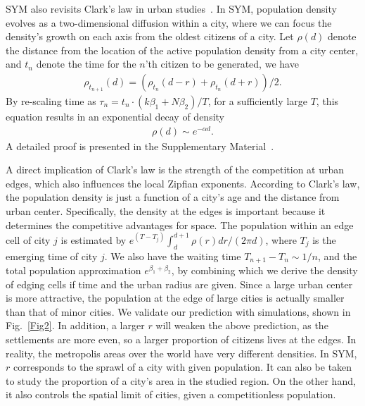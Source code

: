 SYM also revisits Clark's law in urban studies~\cite{clark1951urban}. In SYM, population density evolves as a two-dimensional diffusion within a city\cite{doi:10.1137/0150099}, where we can focus the density's growth on each axis from the oldest citizens of a city. Let $\rho(d)$ denote the distance from the location of the active population density from a city center, and $t_n$ denote the time for the $n$'th citizen to be generated, we have 
\begin{align}
	\rho_{t_{n+1}}(d) = (\rho_{t_{n}}(d-r) + \rho_{t_{n}}(d+r) )/2.\label{loc_den}  
\end{align} By re-scaling time as $\tau_n = t_n\cdot (k\beta_1+N\beta_2)/T$, for a sufficiently large $T$, this equation results in an exponential decay of density
\begin{align}
	\rho(d)\sim e^{-\alpha d}\label{clark_eq}.
\end{align} A detailed proof is presented in the Supplementary Material~\cite{SuppInfo}. 

A direct implication of Clark's law is the strength of the competition at urban edges, which also influences the local Zipfian exponents. According to Clark's law, the population density is just a function of a city's age and the distance from urban center. Specifically, the density at the edges is important because it determines the competitive advantages for space. The population within an edge cell of city $j$ is estimated by $e^{(T-T_j)}\int_{d}^{d+1}\rho(r) dr/(2\pi d)$, where $T_j$ is the emerging time of city $j$. We also have the waiting time $T_{n+1}-T_{n}\sim 1/n$, and the total population approximation $e^{\beta_1+\beta_2}$, by combining which we derive the density of edging cells if time and the urban radius are given. Since a large urban center is more attractive, the population at the edge of large cities is actually smaller than that of minor cities. We validate our prediction with simulations, shown in Fig.~\ref{Fig2}. %
In addition, a larger $r$ will weaken the above prediction, as the settlements are more even, so a larger proportion of citizens lives at the edges. In reality, the metropolis areas over the world have very different densities. In SYM, $r$ corresponds to the sprawl of a city with given population. It can also be taken to study the proportion of a city's area in the studied region. On the other hand, it also controls the spatial limit of cities, given a competitionless population.

